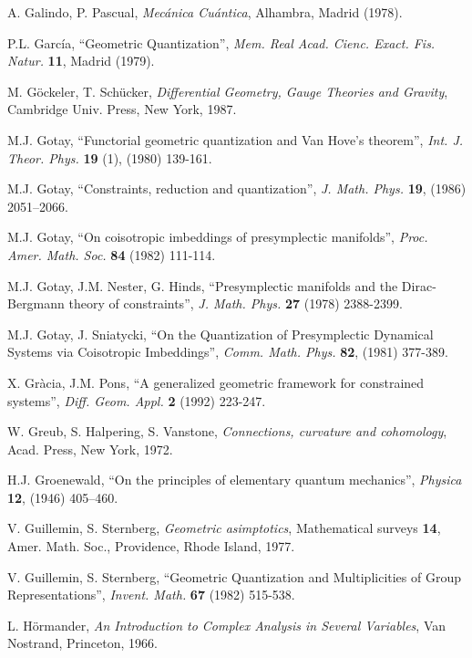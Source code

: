 \documentclass[12pt]{article}
\begin{document}
\begin{thebibliography}{55}
{\sc A. Galindo, P. Pascual},
{\it Mec\'anica Cu\'antica\/},
Alhambra, Madrid (1978).

{\sc P.L. Garc\'ia},
``Geometric Quantization'',
{\it Mem. Real Acad. Cienc. Exact. Fis. Natur.} {\bf 11}, Madrid (1979).

{\sc M. G\"ockeler, T. Sch\"ucker},
{\it Differential Geometry, Gauge Theories and Gravity},
Cambridge Univ. Press, New York, 1987.

{\sc M.J. Gotay},
``Functorial geometric quantization and Van Hove's theorem'',
{\it Int. J. Theor. Phys.}
{\bf 19} (1),  (1980) 139-161.

{\sc M.J. Gotay},
``Constraints, reduction and quantization'',
{\it J. Math. Phys.} {\bf 19},  (1986) 2051--2066.

{\sc M.J. Gotay},
``On coisotropic imbeddings of presymplectic manifolds'',
{\it  Proc. Amer. Math. Soc.} {\bf 84} (1982) 111-114.

{\sc M.J. Gotay, J.M. Nester, G. Hinds},
``Presymplectic manifolds and the Dirac-Bergmann theory of
constraints'',
{\it J. Math. Phys.} {\bf 27} (1978) 2388-2399.

{\sc M.J. Gotay, J. Sniatycki},
``On the Quantization of Presymplectic Dynamical Systems
  via Coisotropic Imbeddings'',
{\it Comm. Math. Phys.} {\bf 82}, (1981) 377-389.

{\sc X. Gr\`acia, J.M. Pons},
``A generalized geometric framework for constrained systems'',
{\it Diff. Geom. Appl.} {\bf 2} (1992) 223-247.

{\sc W. Greub, S. Halpering, S. Vanstone},
{\it Connections, curvature and cohomology},
Acad. Press, New York, 1972.

{\sc H.J. Groenewald},
``On the principles of elementary quantum mechanics'',
{\it Physica}
{\bf 12}, (1946) 405--460.

{\sc V. Guillemin, S. Sternberg},
{\it Geometric asimptotics},
Mathematical surveys {\bf 14},
Amer. Math. Soc., Providence, Rhode Island, 1977.

{\sc V. Guillemin, S. Sternberg},
``Geometric Quantization and Multiplicities of Group Representations'',
{\it Invent. Math.} {\bf 67} (1982) 515-538.

{\sc L. H\"ormander},
{\it An Introduction to Complex Analysis in Several Variables},
Van Nostrand, Princeton, 1966.


\end{thebibliography}
\end{document}
